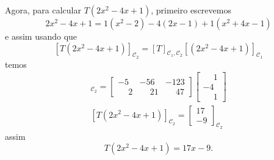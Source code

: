 \begin{exemplos}
\begin{enumerate}[label={\arabic*})]
\begin{solucao}
            Agora, para calcular $T(2x^2 - 4x + 1)$, primeiro escrevemos
            \[
                2x^2 - 4x + 1 = 1(x^2 - 2) - 4(2x - 1) + 1(x^2 + 4x - 1)
            \]
            e assim usando que
            \[
                [T(2x^2 - 4x + 1)]_{\mathcal{C}_2} = [T]_{\mathcal{C}_1, \mathcal{C}_2}[(2x^2 - 4x + 1)]_{\mathcal{C}_1}
            \]
            temos
            \begin{align*}
                [T(2x^2 - 4x + 1)]_{\mathcal{C}_2} = \begin{bmatrix}-5 & -56 & -123\\\phantom{-}2 & \phantom{-}21 & \phantom{-}47\end{bmatrix}\begin{bmatrix}\phantom{-}1 \\ -4\\\phantom{-}1\end{bmatrix}\\
                [T(2x^2 - 4x + 1)]_{\mathcal{C}_2} = \begin{bmatrix}17 \\ -9\end{bmatrix}_{\mathcal{C}_2}
            \end{align*}
            assim
            \[
                T(2x^2 - 4x + 1) = 17x - 9.
            \]
        \end{solucao}


\end{enumerate}
\end{exemplos}
